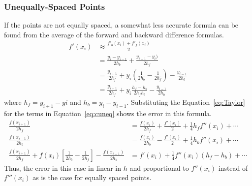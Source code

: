 \documentclass{scrartcl}
\begin{document}
\subsubsection{Unequally-Spaced Points}
If the points are not equally spaced, a somewhat less
accurate formula can be found from the average of the forward
and backward difference formulas.
\begin{align}
f'(x_i) &\approx \frac{f'_b(x_i)+f'_f(x_i)}{2} \label{eq:meanDer}\\
&= \frac{y_i-y_{i-1}}{2h_b}+\frac{y_{i+1}-y_i)}{2h_f}\\
&= \frac{y_{i+1}}{2h_f}+y_i\left(\frac{1}{2h_b}-\frac{1}{2h_f}\right)
	-\frac{y_{i-1}}{2h_b} \label{eq:cuneq}\\
&= \frac{y_{i+1}}{2h_f}+y_i\frac{h_f-h_b}{2h_f h_b}
	-\frac{y_{i-1}}{2h_b}\label{eq:meanb}
\end{align}
where $h_f=y_{i+1}-y{i}$ and $h_b=y_i-y_{i-1}$.
Substituting the Equation~\ref{eq:Taylor} for the terms
in Equation~\ref{eq:cuneq} shows the error in this formula.
\begin{align}
\frac{f(x_{i+1})}{2h_f} &= \frac{f(x_i)}{2h_f}+\frac{f'(x_i)}{2}+
	\frac{1}{4}h_f f''(x_i)+\cdots\\
\frac{f(x_{i-1})}{2h_b} &= \frac{f(x_i)}{2h_b}-\frac{f'(x_i)}{2}+
	\frac{1}{4}h_b f''(x_i)+\cdots\\
\frac{f(x_{i+1})}{2h_f}+f(x_i)\left[\frac{1}{2h_b}-\frac{1}{2h_f}\right]
	-\frac{f(x_{i-1})}{2h_b} &= f'(x_i)+\frac{1}{4}f''(x_i)(h_f-h_b)+\cdots
\end{align}
Thus, the error in this case in linear in $h$ and proportional to
$f''(x_i)$ instead of $f'''(x_i)$ as is the case for equally spaced
points.
\end{document}
